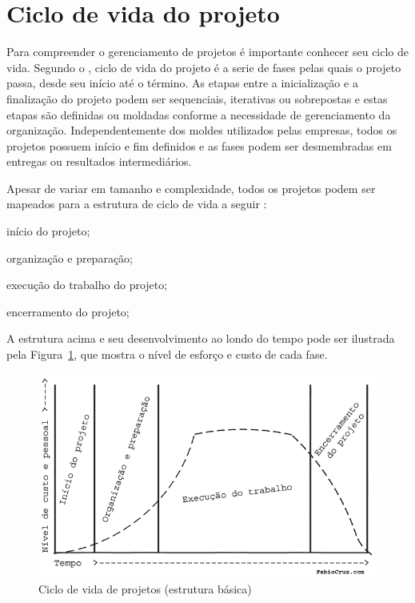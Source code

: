 \documentclass[
    12pt,               %
    openright,          %
    twoside,            %
    a4paper,            %
    chapter=TITLE,     %
    english,            %
    spanish,            %
    portuguese              %
    ]{abntex2}
\begin{document}
\section{Ciclo de vida do projeto}
Para compreender o gerenciamento de projetos é importante conhecer seu ciclo de vida. Segundo o , ciclo de vida do projeto é a serie de fases pelas quais o projeto passa, desde seu início até o término. As etapas entre a inicialização e a finalização do projeto podem ser sequenciais, iterativas ou sobrepostas e estas etapas são definidas ou moldadas conforme a necessidade de gerenciamento da organização. Independentemente dos moldes utilizados pelas empresas, todos os projetos possuem início e fim definidos e as fases podem ser desmembradas em entregas ou resultados intermediários.

Apesar de variar em tamanho e complexidade, todos os projetos podem ser mapeados para a estrutura de ciclo de vida a seguir \cite[p.~39]{pmi2013}:

\begin{alineas}
	\item início do projeto;
	\item organização e preparação;
	\item execução do trabalho do projeto;
	\item encerramento do projeto;
\end{alineas}

A estrutura acima e seu desenvolvimento ao londo do tempo pode ser ilustrada pela Figura~\ref{fig:ciclo_vida_projeto}, que mostra o nível de esforço e custo de cada fase.

\begin{figure}[htb]
\RawFloats
	\caption{\label{fig:ciclo_vida_projeto}Ciclo de vida de projetos (estrutura básica)}
	\begin{center}
	    \includegraphics[scale=0.50]{figuras/ciclo_vida_projeto.png}
	\end{center}
\end{figure}
\end{document}
